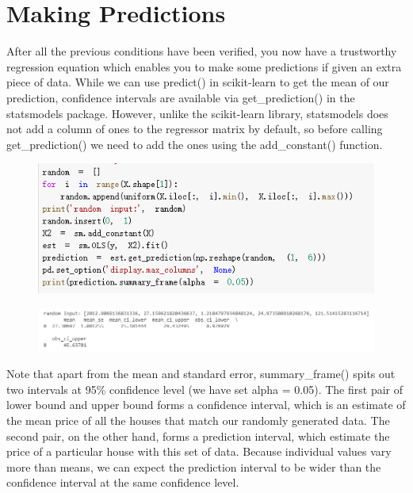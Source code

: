 \documentclass{article}
\begin{document}
\section*{Making Predictions}
After all the previous conditions have been verified, you now have a trustworthy regression equation which enables you to make some predictions if given an extra piece of data. While we can use predict() in scikit-learn to get the mean of our prediction, confidence intervals are available via get\_prediction() in the statsmodels package. However, unlike the scikit-learn library, statsmodels does not add a column of ones to the regressor matrix by default, so before calling get\_prediction() we need to add the ones using the add\_constant() function.
\begin{figure}[H]\centering\includegraphics[width=\linewidth]{23}\end{figure}
\begin{figure}[H]\centering\includegraphics[width=1.05\linewidth]{24}\end{figure}
Note that apart from the mean and standard error, summary\_frame() spits out two intervals at 95\% confidence level (we have set alpha = 0.05). The first pair of lower bound and upper bound forms a confidence interval, which is an estimate of the mean price of all the houses that match our randomly generated data. The second pair, on the other hand, forms a prediction interval, which estimate the price of a particular house with this set of data. Because individual values vary more than means, we can expect the prediction interval to be wider than the confidence interval at the same confidence level.
\end{document}
